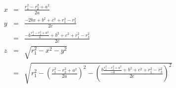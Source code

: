 \begin{eqnarray}
 x & = & \frac{r_1^2 - r_2^2 + a^2}{2a} \label{eq:trilateration_final_x}\\
 y & = & \frac{-2bx + b^2 + c^2 + r_1^2 - r_3^2}{2c} \label{eq:trilateration_final_y}\\
   & = & \frac{-b\frac{r_1^2 - r_2^2 + a^2}{a} + b^2 + c^2 + r_1^2 - r_3^2}{2c} \nonumber \\
 z & = & \sqrt{r_1^2 - x^2 - y^2} \label{eq:trilateration_final_z}\\
   & = & \sqrt{r_1^2 - \left(\frac{r_1^2 - r_2^2 + a^2}{2a}\right)^2 - \left(\frac{b\frac{r_1^2 - r_2^2 + a^2}{-a} + b^2 + c^2 + r_1^2 - r_3^2}{2c}\right)^2} \nonumber
\end{eqnarray}

